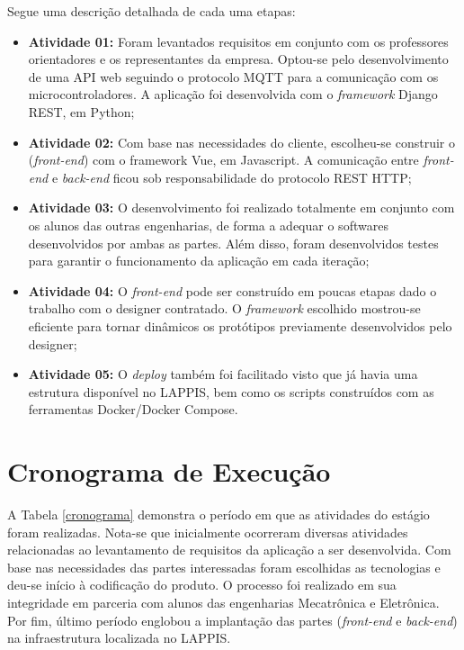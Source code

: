 Segue uma descrição detalhada de cada uma etapas:
\begin{itemize}
  \item \textbf{Atividade 01:} Foram levantados requisitos em
  conjunto com os professores orientadores e os representantes da empresa.
  Optou-se pelo desenvolvimento de uma API web seguindo o protocolo MQTT para a
  comunicação com os microcontroladores. A aplicação foi desenvolvida com o
  \textit{framework} Django REST, em Python;

  \item \textbf{Atividade 02:} Com base nas necessidades do cliente, escolheu-se
  construir o (\textit{front-end}) com o framework Vue, em Javascript. A
  comunicação entre \textit{front-end} e \textit{back-end} ficou sob
  responsabilidade do protocolo REST HTTP;

  \item \textbf{Atividade 03:} O desenvolvimento foi realizado totalmente em
  conjunto com os alunos das outras engenharias, de forma a adequar o softwares
  desenvolvidos por ambas as partes. Além disso, foram desenvolvidos testes para
  garantir o funcionamento da aplicação em cada iteração;

  \item \textbf{Atividade 04:} O \textit{front-end} pode ser construído em
  poucas etapas dado o trabalho com o designer contratado. O \textit{framework}
  escolhido mostrou-se eficiente para tornar dinâmicos os protótipos previamente
  desenvolvidos pelo designer;

  \item \textbf{Atividade 05:} O \textit{deploy} também foi facilitado visto que
  já havia uma estrutura disponível no LAPPIS, bem como os scripts construídos
  com as ferramentas Docker/Docker Compose.
\end{itemize}

\section{Cronograma de Execução}
A Tabela \ref{cronograma} demonstra o período em que as atividades do estágio
foram realizadas. Nota-se que inicialmente ocorreram diversas atividades
relacionadas ao levantamento de requisitos da aplicação a ser desenvolvida. Com
base nas necessidades das partes interessadas foram escolhidas as tecnologias e
deu-se início à codificação do produto. O processo foi realizado em sua
integridade em parceria com alunos das engenharias Mecatrônica e Eletrônica. Por
fim, último período englobou a implantação das partes (\textit{front-end} e
\textit{back-end}) na infraestrutura localizada no LAPPIS.

